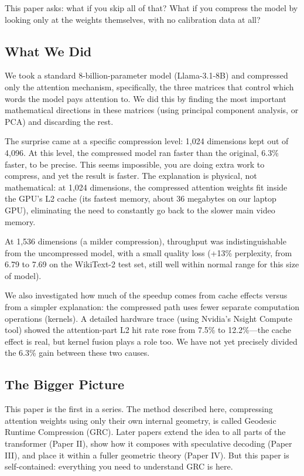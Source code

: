 \documentclass[11pt]{article}
\begin{document}
This paper asks: what if you skip all of that? What if you compress the model
by looking only at the weights themselves, with no calibration data at all?

\subsection{What We Did}

We took a standard 8-billion-parameter model (Llama-3.1-8B) and compressed
only the attention mechanism, specifically, the three matrices that control
which words the model pays attention to. We did this by finding the most
important mathematical directions in these matrices (using principal component
analysis, or PCA) and discarding the rest.

The surprise came at a specific compression level: 1,024 dimensions kept out
of 4,096. At this level, the compressed model ran faster than the
original, 6.3\% faster, to be precise. This seems impossible, you are doing
extra work to compress, and yet the result is faster. The explanation is
physical, not mathematical: at 1,024 dimensions, the compressed attention
weights fit inside the GPU's L2 cache (its fastest memory, about 36 megabytes
on our laptop GPU), eliminating the need to constantly go back to the slower
main video memory.

At 1,536 dimensions (a milder compression), throughput was indistinguishable
from the uncompressed model, with a small quality loss (+13\% perplexity, from
6.79 to 7.69 on the WikiText-2 test set, still well within normal range for
this size of model).

We also investigated how much of the speedup comes from cache effects versus
from a simpler explanation: the compressed path uses fewer separate computation
operations (kernels). A detailed hardware trace (using Nvidia's Nsight Compute
tool) showed the attention-part L2 hit rate rose from 7.5\% to 12.2\%---the
cache effect is real, but kernel fusion plays a role too. We have not yet
precisely divided the 6.3\% gain between these two causes.

\subsection{The Bigger Picture}

This paper is the first in a series. The method described here, compressing
attention weights using only their own internal geometry, is called Geodesic
Runtime Compression (GRC). Later papers extend the idea to all parts of the
transformer (Paper II), show how it composes with speculative decoding
(Paper III), and place it within a fuller geometric theory (Paper IV). But
this paper is self-contained: everything you need to understand GRC is here.
\end{document}
